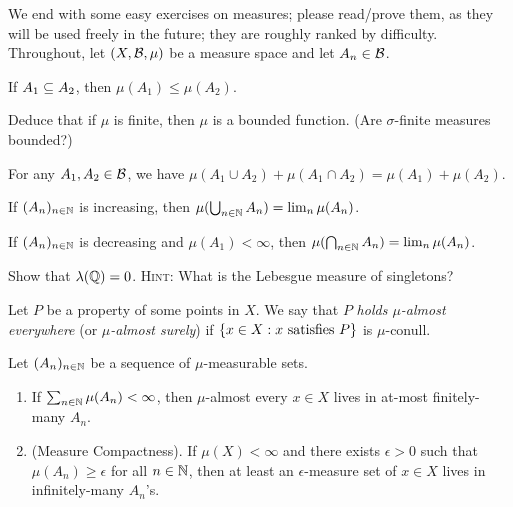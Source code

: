 \documentclass[reqno, twoside]{article}
\begin{document}
    We end with some easy exercises on measures; please read/prove them, as they will be used freely in the future; they are roughly ranked by difficulty. Throughout, let $(X,\mathcal{B},\mu)$ be a measure space and let $A_n\in\mathcal{B}$.

    \begin{exercise}[Monotonicity]
        If $A_1\subseteq A_2$, then $\mu(A_1)\leq\mu(A_2)$.
    \end{exercise}

    Deduce that if $\mu$ is finite, then $\mu$ is a bounded function. (Are $\sigma$-finite measures bounded?)

    \begin{exercise}
        For any $A_1,A_2\in\mathcal{B}$, we have $\mu(A_1\cup A_2)+\mu(A_1\cap A_2)=\mu(A_1)+\mu(A_2)$.
    \end{exercise}

    \begin{exercise}
        If $(A_n)_{n\in\mathbb{N}}$ is increasing, then $\mu(\bigcup_{n\in\mathbb{N}}A_n)=\lim_n\mu(A_n)$.
    \end{exercise}

    \begin{exercise}
        If $(A_n)_{n\in\mathbb{N}}$ is decreasing and $\mu(A_1)<\infty$, then $\mu(\bigcap_{n\in\mathbb{N}}A_n)=\lim_n\mu(A_n)$.
    \end{exercise}

    \begin{exercise}
        Show that $\lambda(\mathbb{Q})=0$. \textsc{Hint:} What is the Lebesgue measure of singletons?
    \end{exercise}

    Let $P$ be a property of some points in $X$. We say that $P$ \textit{holds $\mu$-almost everywhere} (or \textit{$\mu$-almost surely}) if $\left\{x\in X: x\textrm{ satisfies }P\right\}$ is $\mu$-conull.

    \begin{exercise}
        Let $(A_n)_{n\in\mathbb{N}}$ be a sequence of $\mu$-measurable sets.
        \begin{enumerate}
            \item If $\sum_{n\in\mathbb{N}}\mu(A_n)<\infty$, then $\mu$-almost every $x\in X$ lives in at-most finitely-many $A_n$.
                \vspace{-0.05in}
            \item (Measure Compactness). If $\mu(X)<\infty$ and there exists $\epsilon>0$ such that $\mu(A_n)\geq\epsilon$ for all $n\in\mathbb{N}$, then at least an $\epsilon$-measure set of $x\in X$ lives in infinitely-many $A_n$'s.
        \end{enumerate}
    \end{exercise}
\end{document}
